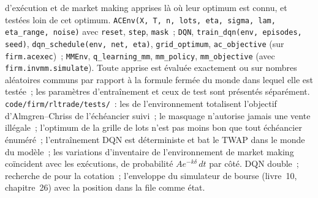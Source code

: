 \begin{build}
  d'exécution et de market making apprises là où leur optimum est connu, et testées loin de cet optimum.
 \texttt{ACEnv(X, T, n, lots, eta, sigma, lam, eta\_range, noise)} avec \texttt{reset}, \texttt{step},
\texttt{mask}~; \texttt{DQN}, \texttt{train\_dqn(env, episodes, seed)}, \texttt{dqn\_schedule(env, net, eta)},
\texttt{grid\_optimum}, \texttt{ac\_objective} (sur \texttt{firm.acexec})~; \texttt{MMEnv}, \texttt{q\_learning\_mm},
\texttt{mm\_policy}, \texttt{mm\_objective} (avec \texttt{firm.invmm.simulate}).
 Toute  apprise est évaluée exactement ou sur nombres aléatoires communs par rapport à la formule fermée du monde dans lequel
elle est testée~; les paramètres d'entraînement et ceux de test sont présentés séparément.
 \texttt{code/firm/rltrade/tests/}~: les  de l'environnement totalisent l'objectif d'Almgren--Chriss de
l'échéancier suivi~; le masquage n'autorise jamais une vente illégale~; l'optimum de la grille de lots n'est pas moins bon que tout échéancier énuméré~;
l'entraînement DQN est déterministe et bat le TWAP dans le monde du modèle~; les variations d'inventaire de l'environnement de market making coïncident
avec les exécutions, de probabilité $Ae^{-k\delta}\,dt$ par côté.
 DQN double~; recherche de  pour la cotation~; l'enveloppe du simulateur de bourse (livre~10, chapitre~26) avec la
position dans la file comme état.
\end{build}

